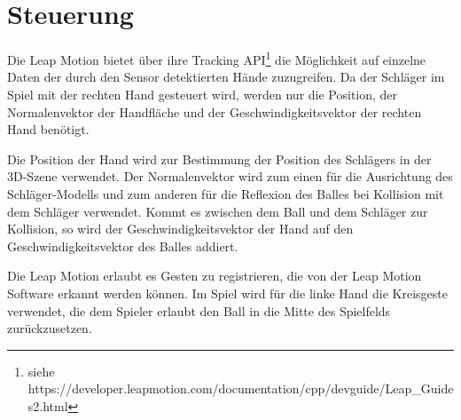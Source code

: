 
\chapter{Steuerung}
\label{Kapitel 3}
%
Die Leap Motion bietet über ihre Tracking API\footnote{ siehe https://developer.leapmotion.com/documentation/cpp/devguide/Leap\_Guides2.html} die Möglichkeit auf einzelne Daten der durch den Sensor detektierten Hände zuzugreifen. Da der Schläger im Spiel mit der rechten Hand gesteuert wird, werden nur die Position, der Normalenvektor der Handfläche und der Geschwindigkeitsvektor der rechten Hand benötigt.

Die Position der Hand wird zur Bestimmung der Position des Schlägers in der 3D-Szene verwendet. Der Normalenvektor wird zum einen für die Ausrichtung des Schläger-Modells und zum anderen für die Reflexion des Balles bei Kollision mit dem Schläger verwendet. Kommt es zwischen dem Ball und dem Schläger zur Kollision, so wird der Geschwindigkeitsvektor der Hand auf den Geschwindigkeitsvektor des Balles addiert.

Die Leap Motion erlaubt es Gesten zu registrieren, die von der Leap Motion Software erkannt werden können. Im Spiel wird für die linke Hand die Kreisgeste verwendet, die dem Spieler erlaubt den Ball in die Mitte des Spielfelds zurückzusetzen.
%
